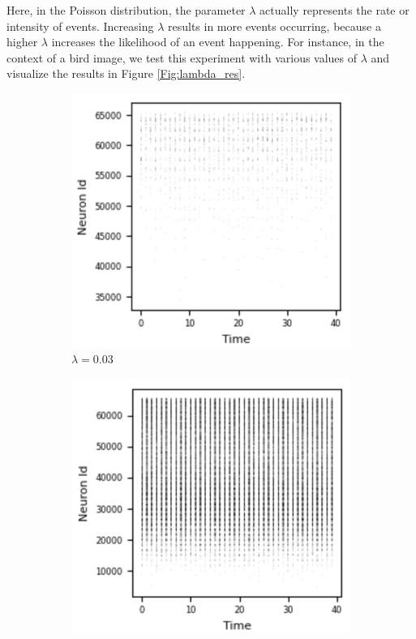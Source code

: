 \documentclass[12pt]{article}
\begin{document}
Here, in the Poisson distribution, the parameter $\lambda$ actually represents the rate or intensity of events. Increasing $\lambda$ results in more events occurring, because a higher $\lambda$ increases the likelihood of an event happening. For instance, in the context of a bird image, we test this experiment with various values of $\lambda$ and visualize the results in Figure \ref{Fig:lambda_res}.


\begin{figure}[H]
\centering
  \begin{subfigure}[b]{0.35\textwidth}
    \includegraphics[width=\textwidth]{Figs/1}
    \caption{$\lambda = 0.03$}
  \end{subfigure}
  \hspace*{50}
  \begin{subfigure}[b]{0.35\textwidth}
    \includegraphics[width=\textwidth]{Figs/2}

\end{subfigure}
\end{figure}
\end{document}
